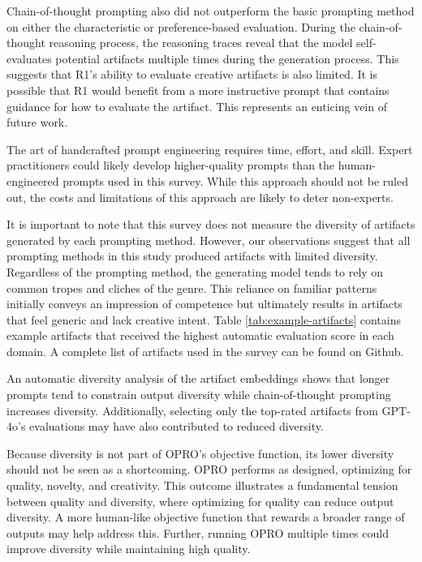 \documentclass[phd,electronic,oneside,twosidetoc,letterpaper,chaptercenter,parttop,lof]{byumsphd}
\begin{document}
Chain-of-thought prompting also did not outperform the basic prompting method on either the characteristic or preference-based evaluation. During the chain-of-thought reasoning process, the reasoning traces reveal that the model self-evaluates potential artifacts multiple times during the generation process. This suggests that R1’s ability to evaluate creative artifacts is also limited. It is possible that R1 would benefit from a more instructive prompt that contains guidance for how to evaluate the artifact. This represents an enticing vein of future work.

The art of handcrafted prompt engineering requires time, effort, and skill. Expert practitioners could likely develop higher-quality prompts than the human-engineered prompts used in this survey. While this approach should not be ruled out, the costs and limitations of this approach are likely to deter non-experts.

It is important to note that this survey does not measure the diversity of artifacts generated by each prompting method. However, our observations suggest that all prompting methods in this study produced artifacts with limited diversity. Regardless of the prompting method, the generating model tends to rely on common tropes and cliches of the genre. This reliance on familiar patterns initially conveys an impression of competence but ultimately results in artifacts that feel generic and lack creative intent. 
Table \ref{tab:example-artifacts} contains example artifacts that received the highest automatic evaluation score in each domain. A complete list of artifacts used in the survey can be found on Github.

An automatic diversity analysis of the artifact embeddings shows that longer prompts tend to constrain output diversity while chain-of-thought prompting increases diversity. Additionally, selecting only the top-rated artifacts from GPT-4o's evaluations may have also contributed to reduced diversity.

Because diversity is not part of OPRO’s objective function, its lower diversity should not be seen as a shortcoming. OPRO performs as designed, optimizing for quality, novelty, and creativity. This outcome illustrates a fundamental tension between quality and diversity, where optimizing for quality can reduce output diversity. A more human-like objective function that rewards a broader range of outputs may help address this. Further, running OPRO multiple times could improve diversity while maintaining high quality.
\end{document}
